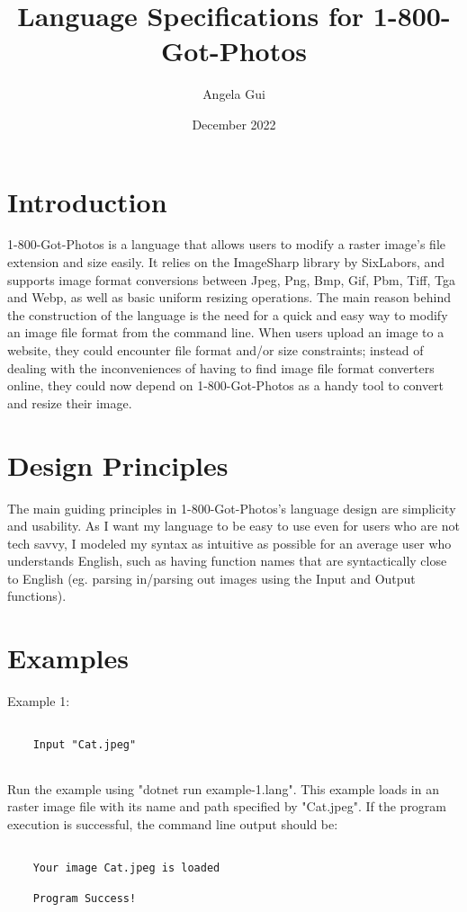 \documentclass{article}
\title{Language Specifications for 1-800-Got-Photos}
\author{Angela Gui}
\date{December 2022}
\begin{document}
\maketitle

\section{Introduction}

1-800-Got-Photos is a language that allows users to modify a raster image's file extension and size easily. It relies on the ImageSharp library by SixLabors, and supports image format conversions between Jpeg, Png, Bmp, Gif, Pbm, Tiff, Tga and Webp, as well as basic uniform resizing operations.
\vskip 0.2in
The main reason behind the construction of the language is the need for a quick and easy way to modify an image file format from the command line. When users upload an image to a website, they could encounter file format and/or size constraints; instead of dealing with the inconveniences of having to find image file format converters online, they could now depend on 1-800-Got-Photos as a handy tool to convert and resize their image.

\section{Design Principles}

The main guiding principles in 1-800-Got-Photos's language design are simplicity and usability. As I want my language to be easy to use even for users who are not tech savvy, I modeled my syntax as intuitive as possible for an average user who understands English, such as having function names that are syntactically close to English (eg. parsing in/parsing out images using the Input and Output functions).

\section{Examples}

    Example 1: \begin{verbatim}

    Input "Cat.jpeg"
        
    \end{verbatim}

Run the example using "dotnet run example-1.lang". This example loads in an raster image file with its name and path specified by "Cat.jpeg". If the program execution is successful, the command line output should be: 
    \begin{verbatim}

    Your image Cat.jpeg is loaded 

    Program Success!

        
    \end{verbatim}
    
\end{document}
